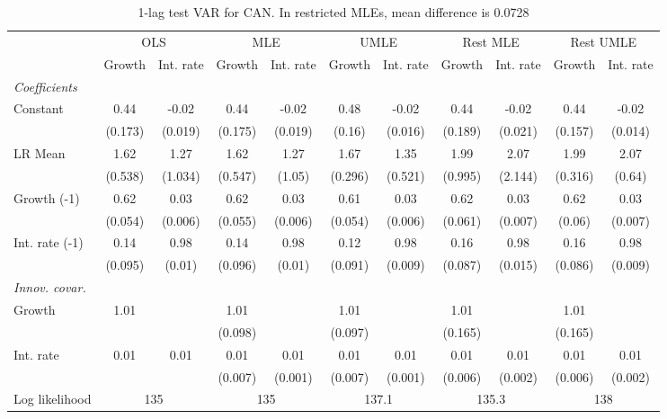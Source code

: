 \begin{table}[htbp] 
	\centering
	\begin{tabular}{@{\extracolsep{4pt}}lcccccccccc@{}}		\hline\hline
		 		 & \multicolumn{2}{c}{OLS} &\multicolumn{2}{c}{MLE} &\multicolumn{2}{c}{UMLE} &\multicolumn{2}{c}{Rest MLE} &\multicolumn{2}{c}{Rest UMLE} \\ 
 		 & Growth 	 & Int. rate 	 & Growth 	 & Int. rate 	 & Growth 	 & Int. rate 	 & Growth 	 & Int. rate 	 & Growth 	 & Int. rate\\\cline{2-3}\cline{4-5}\cline{6-7}\cline{8-9}\cline{10-11}
\rule{0pt}{4ex} 
 \emph{Coefficients} 	  		 & 		 & 		 & 		 & 		 & 		 & 		 & 		 & 		 & 		 &\\ 
\quad Constant 	 & 0.44 	 & -0.02 	 & 0.44 	 & -0.02 	 & 0.48 	 & -0.02 	 & 0.44 	 & -0.02 	 & 0.44 	 & -0.02	 \\ 
 		 & (0.173) 	 & (0.019) 	 & (0.175) 	 & (0.019) 	 & (0.16) 	 & (0.016) 	 & (0.189) 	 & (0.021) 	 & (0.157) 	 & (0.014) 	 \\ 
\quad LR Mean 	 & 1.62 	 & 1.27 	 & 1.62 	 & 1.27 	 & 1.67 	 & 1.35 	 & 1.99 	 & 2.07 	 & 1.99 	 & 2.07	 \\ 
 		 & (0.538) 	 & (1.034) 	 & (0.547) 	 & (1.05) 	 & (0.296) 	 & (0.521) 	 & (0.995) 	 & (2.144) 	 & (0.316) 	 & (0.64) 	 \\ 
\quad Growth (-1) 	 &0.62 	 & 0.03 	 & 0.62 	 & 0.03 	 & 0.61 	 & 0.03 	 & 0.62 	 & 0.03 	 & 0.62 	 & 0.03	 \\ 
 		 & (0.054) 	 & (0.006) 	 & (0.055) 	 & (0.006) 	 & (0.054) 	 & (0.006) 	 & (0.061) 	 & (0.007) 	 & (0.06) 	 & (0.007) 	 \\ 
\quad Int. rate (-1) 	 &0.14 	 & 0.98 	 & 0.14 	 & 0.98 	 & 0.12 	 & 0.98 	 & 0.16 	 & 0.98 	 & 0.16 	 & 0.98	 \\ 
 		 & (0.095) 	 & (0.01) 	 & (0.096) 	 & (0.01) 	 & (0.091) 	 & (0.009) 	 & (0.087) 	 & (0.015) 	 & (0.086) 	 & (0.009) 	 \\ 
\rule{0pt}{4ex} \emph{Innov. covar.}  	 & 	 & 	 & 	 & 	 & 	 & 	 & 	 & 	 & 	 &\\ 
\quad Growth 	 &1.01 	 &  	 & 1.01 	 &  	 & 1.01 	 &  	 & 1.01 	 &  	 & 1.01 	 & 	 \\ 
 		 &  	 &  	 & (0.098) 	 &  	 & (0.097) 	 &  	 & (0.165) 	 &  	 & (0.165) 	 &  	 \\ 
\quad Int. rate 	 &0.01 	 & 0.01 	 & 0.01 	 & 0.01 	 & 0.01 	 & 0.01 	 & 0.01 	 & 0.01 	 & 0.01 	 & 0.01	 \\ 
 		 &  	 &  	 & (0.007) 	 & (0.001) 	 & (0.007) 	 & (0.001) 	 & (0.006) 	 & (0.002) 	 & (0.006) 	 & (0.002) 	 \\ 
 \hline \rule{0pt}{4ex} 
  Log likelihood 	 &\multicolumn{2}{c}{135} 	 & \multicolumn{2}{c}{135} 	 & \multicolumn{2}{c}{137.1} 	 & \multicolumn{2}{c}{135.3} 	 & \multicolumn{2}{c}{138}\\ 

 \hline 	\end{tabular}		\caption{1-lag test VAR for CAN. In restricted MLEs, mean difference is 0.0728}
		\label{tab:CAN1lag}

\end{table}